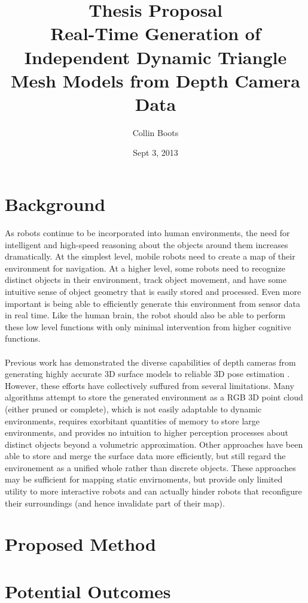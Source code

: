 \documentclass[english]{article}
\title{Thesis Proposal \\ Real-Time Generation of Independent Dynamic Triangle Mesh Models from Depth Camera Data}
\author{Collin Boots}
\date{Sept 3, 2013}
\begin{document}
\maketitle
\section*{Background}
As robots continue to be incorporated into human environments, the need for intelligent and high-speed reasoning about the objects around them increases dramatically. At the simplest level, mobile robots need to create a map of their environment for navigation. At a higher level, some robots need to recognize distinct objects in their environment, track object movement, and have some intuitive sense of object geometry that is easily stored and processed. Even more important is being able to efficiently generate this environment from sensor data in real time. Like the human brain, the robot should also be able to perform these low level functions with only minimal intervention from higher cognitive functions.\\
\\
Previous work has demonstrated the diverse capabilities of depth cameras from generating highly accurate 3D surface models \cite{KinectFusion} to reliable 3D pose estimation \cite{Endres,Taguchi}. However, these efforts have collectively suffured from several limitations. Many algorithms attempt to store the generated environment as a RGB 3D point cloud (either pruned or complete), which is not easily adaptable to dynamic environments, requires exorbitant quantities of memory to store large environments, and provides no intuition to higher perception processes about distinct objects beyond a volumetric approximation. Other approaches have been able to store and merge the surface data more efficiently, but still regard the environement as a unified whole rather than discrete objects. These approaches may be sufficient for mapping static envirnoments, but provide only limited utility to more interactive robots and can actually hinder robots that reconfigure their surroundings (and hence invalidate part of their map).

\section*{Proposed Method}


\section*{Potential Outcomes}



\end{document}
